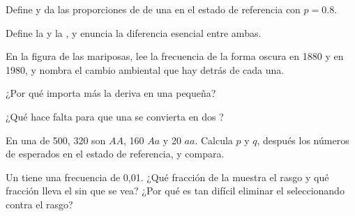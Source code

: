 \begin{exercise}[$\star$]\label{exo:g12:selection-drift-speciation:1}
Define  y da las proporciones de  de una
 en el estado de referencia con $p = 0.8$.
\end{exercise}

\begin{exercise}[$\star$]\label{exo:g12:selection-drift-speciation:2}
Define la  y la , y enuncia la
diferencia esencial entre ambas.
\end{exercise}

\begin{exercise}[$\star$]\label{exo:g12:selection-drift-speciation:3}
En la figura de las mariposas, lee la frecuencia de la forma oscura en
1880 y en 1980, y nombra el cambio ambiental que hay detrás de cada
una.
\end{exercise}

\begin{exercise}[$\star$]\label{exo:g12:selection-drift-speciation:4}
¿Por qué importa más la deriva en una  pequeña?
\end{exercise}

\begin{exercise}[$\star$]\label{exo:g12:selection-drift-speciation:5}
¿Qué hace falta para que una  se convierta en dos ?
\end{exercise}

\begin{exercise}[$\star\star$]\label{exo:g12:selection-drift-speciation:6}
En una  de 500, 320 son $AA$, 160 $Aa$ y 20 $aa$. Calcula $p$
y $q$, después los números de  esperados en el estado de
referencia, y compara.
\end{exercise}

\begin{exercise}[$\star\star$]\label{exo:g12:selection-drift-speciation:7}
Un   tiene una frecuencia de 0,01. ¿Qué fracción de la
 muestra el rasgo  y qué fracción lleva el  sin
que se vea? ¿Por qué es tan difícil eliminar el  seleccionando
contra el rasgo?
\end{exercise}

